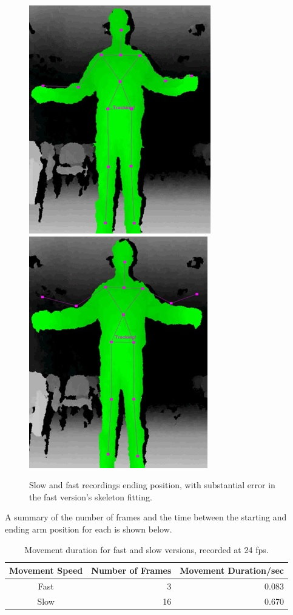 \documentclass[a4paper]{article}
\begin{document}
\begin{figure}
\center
\includegraphics[scale=0.5]{SlowEnd.jpg} \includegraphics[scale=0.5]{FastEnd.jpg}
\caption{Slow and fast recordings ending position, with substantial error in the fast version's skeleton fitting.}
\end{figure}


\noindent A summary of the number of frames and the time between the starting and ending arm position for each  is shown below.

\begin{table}[H]
\center
\begin{tabular}{| c | r | r |}
\hline
Movement Speed & Number of Frames & Movement Duration/sec\\
\hline
Fast & 3 & 0.083\\
Slow & 16 & 0.670\\
\hline
\end{tabular}
\caption{Movement duration for fast and slow versions, recorded at 24 fps.}
\end{table}
\end{document}
